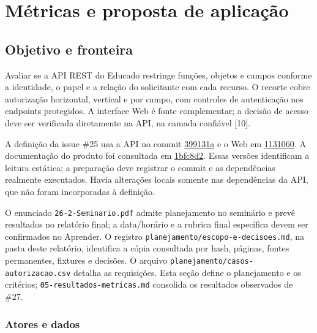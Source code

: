 \section{Métricas e proposta de
aplicação}\label{muxe9tricas-e-proposta-de-aplicauxe7uxe3o}

\subsection{Objetivo e fronteira}\label{objetivo-e-fronteira}

Avaliar se a API REST do Educado restringe funções, objetos e campos
conforme a identidade, o papel e a relação do solicitante com cada
recurso. O recorte cobre autorização horizontal, vertical e por campo,
com controles de autenticação nos endpoints protegidos. A interface Web
é fonte complementar; a decisão de acesso deve ser verificada
diretamente na API, na camada confiável {[}10{]}.

A definição da issue \#25 usa a API no commit
\href{https://github.com/ErasmusEgalitarian/educado-api/tree/399131a808ed76b3910f9fc1ab3db34ddc0f0d56}{399131a}
e o Web em
\href{https://github.com/ErasmusEgalitarian/educado-web/tree/1131060f370f2c57eaeed2cd541f8af6fae8376c}{1131060}.
A documentação do produto foi consultada em
\href{https://github.com/ErasmusEgalitarian/educado-docs/tree/1bfc8d23177a171669cf3e491a4996cee21e3310}{1bfc8d2}.
Essas versões identificam a leitura estática; a preparação deve
registrar o commit e as dependências realmente executados. Havia
alterações locais somente nas dependências da API, que não foram
incorporadas à definição.

O enunciado \texttt{26-2-Seminario.pdf} admite planejamento no seminário
e prevê resultados no relatório final; a data/\allowbreak{}horário e a rubrica final
específica devem ser confirmados no Aprender. O registro
\texttt{planejamento/\allowbreak{}escopo-e-decisoes.md}, na pasta deste relatório,
identifica a cópia consultada por hash, páginas, fontes permanentes,
fixtures e decisões. O arquivo
\texttt{planejamento/\allowbreak{}casos-autorizacao.csv} detalha as requisições. Esta
seção define o planejamento e os critérios;
\texttt{05-resultados-metricas.md} consolida os resultados observados de
\#27.

\subsubsection{Atores e dados}\label{atores-e-dados}

